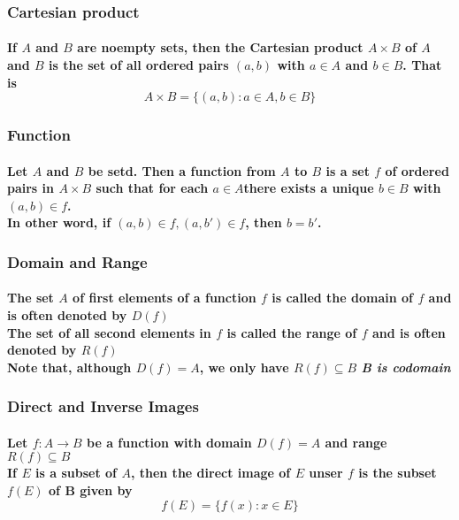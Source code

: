 \documentclass{article}
\begin{document}
            \subsubsection{Cartesian product}
            \paragraph{If $A$ and $B$ are noempty sets, then the \textbf{Cartesian product} $A \times B$ of $A$ and $B$ is the set of all ordered pairs $(a,b)$ with $a\in A$ and $b\in B$. That is 
            $$A\times B = \{(a,b):a\in A,b\in B\}$$}
                

            \subsubsection{Function}
            \paragraph{Let $A$ and $B$ be setd. Then a \textbf{function} from $A$ to $B$ is a set $f$ of ordered pairs in $A\times B$ such that for each $a\in A$there exists a unique $b\in B$ with $(a,b)\in f$.
            \\
            In other word, if $(a,b)\in f,(a,b')\in f$, then $b=b'$.}
                
            \subsubsection{Domain and Range}
            \paragraph{The set $A$ of first elements of a function $f$ is called the \textbf{domain} of $f$ and is often denoted by $D(f)$
            \\
            The set of all second elements in $f$ is called the \textbf{range} of $f$ and is often denoted by $R(f)$
            \\
            \textbf{Note that}, although $D(f)=A$, we only have $R(f)\subseteq B$
            \textit{B is codomain}
            }

            \subsubsection{Direct and Inverse Images}
            \paragraph{
                Let $f:A\rightarrow B$ be a function with domain $D(f)=A$ and range $R(f)\subseteq B$
                \\
                If $E$ is a subset of $A$, then the \textbf{direct image} of $E$ unser $f$ is the subset $f(E)$ of B given by
                $$ f(E)=\{f(x):x\in E\}$$
            }
\end{document}
